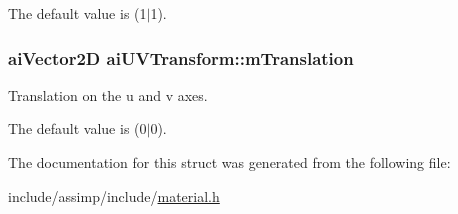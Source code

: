 The default value is (1$|$1). \hypertarget{structai_u_v_transform_a8c7f35959aa342bf0cef670246fbb813}{
\subsubsection[{m\-Translation}]{ {\bf ai\-Vector2\-D} ai\-U\-V\-Transform\-::m\-Translation}}\label{structai_u_v_transform_a8c7f35959aa342bf0cef670246fbb813}
Translation on the u and v axes.

The default value is (0$|$0). 

The documentation for this struct was generated from the following file\-:\begin{DoxyCompactItemize}
\item 
include/assimp/include/\hyperlink{material_8h}{material.\-h}\end{DoxyCompactItemize}
